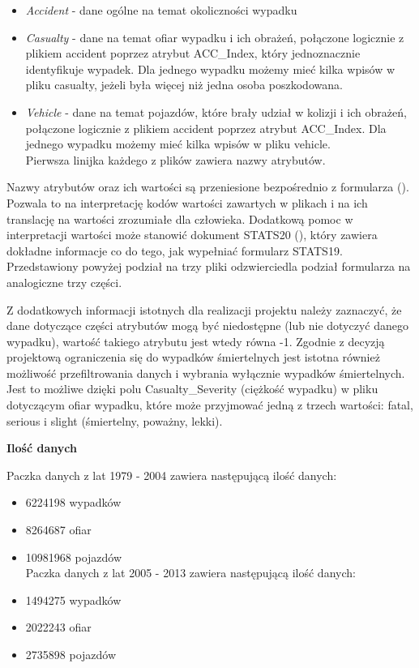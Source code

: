 \begin{itemize}
\itemsep-14pt\parskip0pt
\item
  \emph{Accident} - dane ogólne na temat okoliczności wypadku\\
\item
  \emph{Casualty} - dane na temat ofiar wypadku i ich obrażeń, połączone
  logicznie z plikiem accident poprzez atrybut ACC\_Index, który
  jednoznacznie identyfikuje wypadek. Dla jednego wypadku możemy mieć
  kilka wpisów w pliku casualty, jeżeli była więcej niż jedna osoba
  poszkodowana.\\
\item
  \emph{Vehicle} - dane na temat pojazdów, które brały udział w kolizji
  i ich obrażeń, połączone logicznie z plikiem accident poprzez atrybut
  ACC\_Index. Dla jednego wypadku możemy mieć kilka wpisów w pliku
  vehicle.\\Pierwsza linijka każdego z plików zawiera nazwy atrybutów.
\end{itemize}

Nazwy atrybutów oraz ich wartości są przeniesione bezpośrednio z
formularza (\cite{formularz}). Pozwala to na interpretację kodów wartości zawartych w plikach
i na ich translację na wartości zrozumiałe dla człowieka. Dodatkową
pomoc w interpretacji wartości może stanowić dokument
STATS20 (\cite{stats20}), który zawiera dokładne informacje co do tego, jak wypełniać
formularz STATS19. Przedstawiony powyżej podział na trzy pliki
odzwierciedla podział formularza na analogiczne trzy części.

Z dodatkowych informacji istotnych dla realizacji projektu należy
zaznaczyć, że dane dotyczące części atrybutów mogą być niedostępne (lub
nie dotyczyć danego wypadku), wartość takiego atrybutu jest wtedy równa
-1. Zgodnie z decyzją projektową ograniczenia się do wypadków
śmiertelnych jest istotna również możliwość przefiltrowania danych i
wybrania wyłącznie wypadków śmiertelnych. Jest to możliwe dzięki polu
Casualty\_Severity (ciężkość wypadku) w pliku dotyczącym ofiar wypadku,
które może przyjmować jedną z trzech wartości: fatal, serious i slight
(śmiertelny, poważny, lekki).

\textbf{Ilość danych}

Paczka danych z lat 1979 - 2004 zawiera następującą ilość danych:

\begin{itemize}
\itemsep-14pt\parskip0pt
\item
  6224198 wypadków\\
\item
  8264687 ofiar\\
\item
  10981968 pojazdów\\Paczka danych z lat 2005 - 2013 zawiera następującą
  ilość danych:\\
\item
  1494275 wypadków\\
\item
  2022243 ofiar\\
\item
  2735898 pojazdów
\end{itemize}

